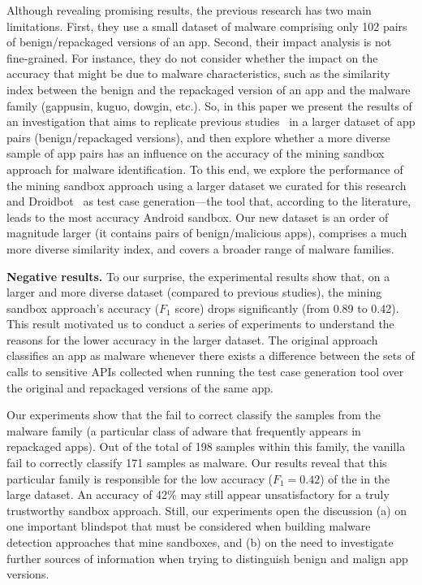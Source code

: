 Although revealing promising results, the previous research has two main limitations. First, they use a small dataset of malware comprising only 102 pairs of benign/repackaged versions of an app. Second, their impact analysis is not fine-grained. For instance, they do not consider whether the impact on the accuracy that might be due to malware characteristics, such as the similarity index between the benign and the repackaged version of an app and the malware family (gappusin, kuguo, dowgin, etc.). So, in this paper we present the results of an investigation that aims to replicate previous studies~\cite{DBLP:conf/wcre/BaoLL18,DBLP:conf/scam/CostaMCMVBC20} in a larger dataset of app pairs (benign/repackaged versions), and then explore whether a more diverse sample of app pairs has an influence on the accuracy of the mining sandbox approach for malware identification. To this end, we explore the performance of the mining sandbox approach using a larger dataset we curated for this research and Droidbot~\cite{DBLP:conf/icse/LiYGC17} as test case generation---the tool that, according to the literature, leads to the most accuracy Android sandbox. Our new dataset is an order of magnitude larger (it contains \apps pairs of benign/malicious apps), comprises a much more diverse similarity index, and covers a broader range of malware families. 



{\bf Negative results.} To our surprise, the experimental results show that, on a larger and more diverse dataset (compared to previous studies), the mining sandbox approach's accuracy ($F_1$ score) drops significantly (from 0.89 to 0.42). This result motivated us to conduct a series of experiments to understand the reasons for the lower accuracy in the larger dataset. The original approach classifies an app as malware whenever there exists a difference between the sets of calls to sensitive APIs collected when running the test case generation tool over the original and repackaged versions of the same app.


Our experiments show that the \mas fail to correct classify the samples
from the \gps malware family (a particular class of adware that frequently appears in repackaged apps). Out of the total of 198 samples within this family, the vanilla \mas fail to correctly classify 171 samples as malware. Our results reveal that this particular family is
responsible for the low accuracy ($F_1 = 0.42$) of the \mas in the large dataset. 
An accuracy of 42\% may still appear unsatisfactory for a truly trustworthy sandbox approach. Still, 
our experiments open the discussion (a) on one important blindspot that must be considered when building 
malware detection approaches that mine sandboxes, and (b) on the need to investigate further sources of
information when trying to distinguish benign and malign app versions.

